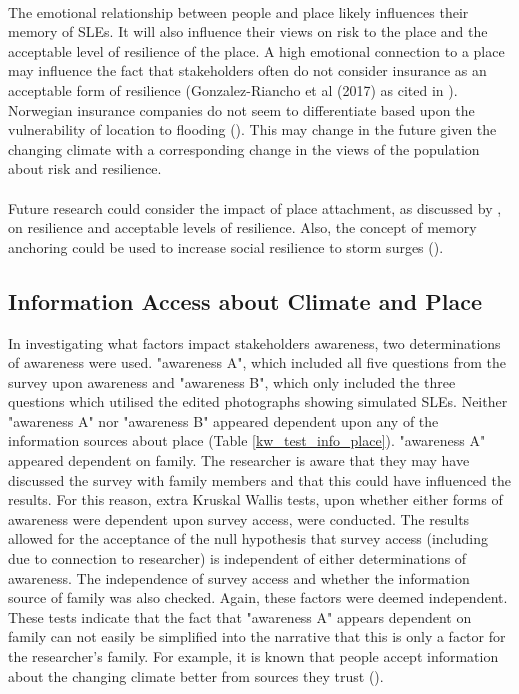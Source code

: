 \paragraph{}

The emotional relationship between people and place likely influences their memory of SLEs. It will also influence their views on risk to the place and the acceptable level of resilience of the place. A high emotional connection to a place may influence the fact that stakeholders often do not consider insurance as an acceptable form of resilience (Gonzalez-Riancho et al (2017) as cited in \cite{gerkensmeier_governing_2018}). Norwegian insurance companies do not seem to differentiate based upon the vulnerability of location to flooding (\cite{lujala_role_2020}). This may change in the future given the changing climate with a corresponding change in the views of the population about risk and resilience.
\paragraph{}
Future research could consider the impact of place attachment, as discussed by \cite{ariccio_place_2021}, on resilience and acceptable levels of resilience. Also, the concept of memory anchoring could be used to increase social resilience to storm surges (\cite{de_guttry_expiry_2022}).  


\subsection{Information Access about Climate and Place}\label{discuss-info-access}
In investigating what factors impact stakeholders awareness, two determinations of awareness were used. "awareness A", which included all five questions from the survey upon awareness and "awareness B", which only included the three questions which utilised the edited photographs showing simulated SLEs. Neither "awareness A" nor "awareness B" appeared dependent upon any of the information sources about place  (Table \ref{kw_test_info_place}). "awareness A" appeared dependent on family. The researcher is aware that they may have discussed the survey with family members and that this could have influenced the results. For this reason, extra Kruskal Wallis tests, upon whether either forms of awareness were dependent upon survey access, were conducted. The results allowed for the acceptance of the null hypothesis that survey access (including due to connection to researcher) is independent of either determinations of awareness. The independence of survey access and whether the information source of family was also checked. Again, these factors were deemed independent. These tests indicate that the fact that "awareness A" appears dependent on family can not easily be simplified into the narrative that this is only a factor for the researcher's family. For example, it is known that people accept information about the changing climate better from sources they trust (\cite{corner_a_principles_2018}). 
